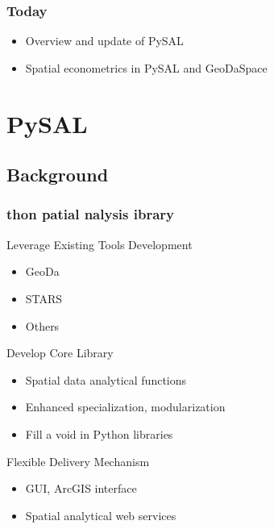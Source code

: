 \documentclass[nototal]{beamer}
\begin{document}
\begin{frame}
	\frametitle{Today}
 \begin{itemize}
 \item Overview and update of PySAL
 \item Spatial econometrics in PySAL and GeoDaSpace
 \end{itemize}
 \end{frame} 


\section{PySAL} 

\subsection{Background} 

\begin{frame}
	\frametitle{{\color{green}{Py}}thon {\color{green}{S}}patial {\color{green}{A}}nalysis {\color{green}{L}}ibrary}
 
\begin{block}{Leverage Existing Tools Development}
 \begin{itemize}
 \item GeoDa 
 \item STARS
 \item Others
 \end{itemize}
 \end{block} 
\begin{block}{Develop Core Library}
 \begin{itemize}
 \item Spatial data analytical functions 
 \item Enhanced specialization, modularization 
 \item Fill a void in Python libraries 
 \end{itemize}
 \end{block} 
\begin{block}{Flexible Delivery Mechanism}
 \begin{itemize}
 \item GUI, ArcGIS interface 
 \item Spatial analytical web services 
 \end{itemize}
 \end{block} \end{frame} 
\end{document}
